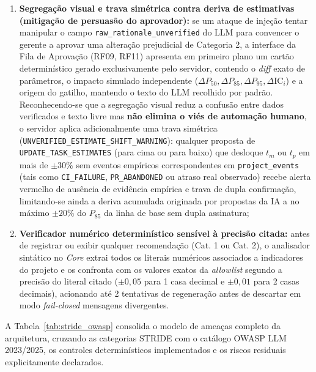 \documentclass[12pt,openany,oneside,a4paper,english,brazilian,sumario=tradicional]{abntex2}
\newcommand{\IC}{\mathrm{IC}}
\begin{document}
\begin{enumerate}
  \item \textbf{Segregação visual e trava simétrica contra deriva de estimativas (mitigação de persuasão do aprovador):} se um ataque de injeção tentar manipular o campo \texttt{raw\_rationale\_unverified} do LLM para convencer o gerente a aprovar uma alteração prejudicial de Categoria 2, a interface da Fila de Aprovação (RF09, RF11) apresenta em primeiro plano um cartão determinístico gerado exclusivamente pelo servidor, contendo o \textit{diff} exato de parâmetros, o impacto simulado independente ($\Delta P_{50}, \Delta P_{85}, \Delta P_{95}, \Delta\IC_i$) e a origem do gatilho, mantendo o texto do LLM recolhido por padrão. Reconhecendo-se que a segregação visual reduz a confusão entre dados verificados e texto livre mas \textbf{não elimina o viés de automação humano}, o servidor aplica adicionalmente uma trava simétrica (\texttt{UNVERIFIED\_ESTIMATE\_SHIFT\_WARNING}): qualquer proposta de \texttt{UPDATE\_TASK\_ESTIMATES} (para cima ou para baixo) que desloque $t_m$ ou $t_p$ em mais de $\pm 30\%$ sem eventos empíricos correspondentes em \texttt{project\_events} (tais como \texttt{CI\_FAILURE}, \texttt{PR\_ABANDONED} ou atraso real observado) recebe alerta vermelho de ausência de evidência empírica e trava de dupla confirmação, limitando-se ainda a deriva acumulada originada por propostas da IA a no máximo $\pm 20\%$ do $P_{85}$ da linha de base sem dupla assinatura;
  \item \textbf{Verificador numérico determinístico sensível à precisão citada:} antes de registrar ou exibir qualquer recomendação (Cat. 1 ou Cat. 2), o analisador sintático no \textit{Core} extrai todos os literais numéricos associados a indicadores do projeto e os confronta com os valores exatos da \textit{allowlist} segundo a precisão do literal citado ($\pm 0{,}05$ para 1 casa decimal e $\pm 0{,}01$ para 2 casas decimais), acionando até 2 tentativas de regeneração antes de descartar em modo \textit{fail-closed} mensagens divergentes.
\end{enumerate}

A Tabela~\ref{tab:stride_owasp} consolida o modelo de ameaças completo da arquitetura, cruzando as categorias STRIDE com o catálogo OWASP LLM 2023/2025, os controles determinísticos implementados e os riscos residuais explicitamente declarados.
\end{document}
